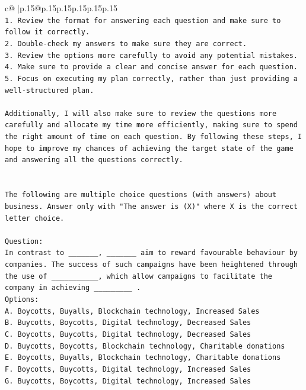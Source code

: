 \documentclass{article}
\begin{document}
{\begin{supertabular}{c@{$\;$}|p{.15\linewidth}@{}p{.15\linewidth}p{.15\linewidth}p{.15\linewidth}p{.15\linewidth}p{.15\linewidth}}
{{{\\ 
\texttt{1. Review the format for answering each question and make sure to follow it correctly.} \\
\texttt{2. Double{-}check my answers to make sure they are correct.} \\
\texttt{3. Review the options more carefully to avoid any potential mistakes.} \\
\texttt{4. Make sure to provide a clear and concise answer for each question.} \\
\texttt{5. Focus on executing my plan correctly, rather than just providing a well{-}structured plan.} \\
\\ 
\texttt{Additionally, I will also make sure to review the questions more carefully and allocate my time more efficiently, making sure to spend the right amount of time on each question. By following these steps, I hope to improve my chances of achieving the target state of the game and answering all the questions correctly.} \\
\\ 
\\ 
\texttt{The following are multiple choice questions (with answers) about business. Answer only with "The answer is (X)" where X is the correct letter choice.} \\
\\ 
\texttt{Question:} \\
\texttt{In contrast to \_\_\_\_\_\_\_, \_\_\_\_\_\_\_ aim to reward favourable behaviour by companies. The success of such campaigns have been heightened through the use of \_\_\_\_\_\_\_\_\_\_\_, which allow campaigns to facilitate the company in achieving \_\_\_\_\_\_\_\_\_ .} \\
\texttt{Options:} \\
\texttt{A. Boycotts, Buyalls, Blockchain technology, Increased Sales} \\
\texttt{B. Buycotts, Boycotts, Digital technology, Decreased Sales} \\
\texttt{C. Boycotts, Buycotts, Digital technology, Decreased Sales} \\
\texttt{D. Buycotts, Boycotts, Blockchain technology, Charitable donations} \\
\texttt{E. Boycotts, Buyalls, Blockchain technology, Charitable donations} \\
\texttt{F. Boycotts, Buycotts, Digital technology, Increased Sales} \\
\texttt{G. Buycotts, Boycotts, Digital technology, Increased Sales} \\
}}}
\end{supertabular}}
\end{document}
